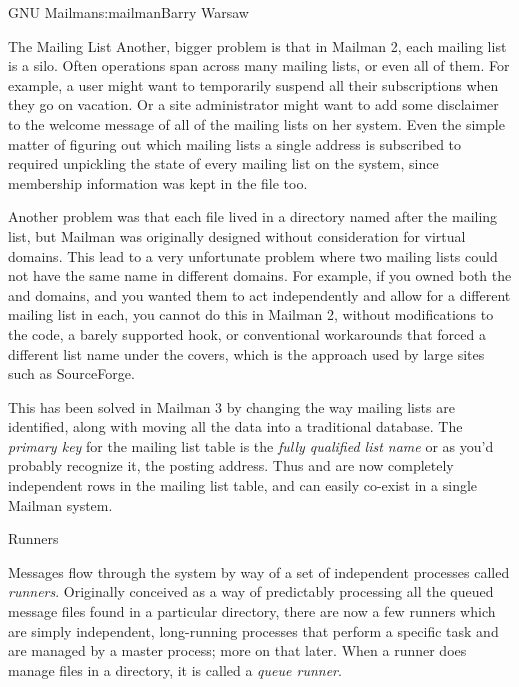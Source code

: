 \begin{aosachapter}{GNU Mailman}{s:mailman}{Barry Warsaw}
\begin{aosasect1}{The Mailing List}
Another, bigger problem is that in Mailman 2, each mailing list is a
silo.  Often operations span across many mailing lists, or even all of
them.  For example, a user might want to temporarily suspend all their
subscriptions when they go on vacation.  Or a site administrator might
want to add some disclaimer to the welcome message of all of the
mailing lists on her system.  Even the simple matter of figuring out
which mailing lists a single address is subscribed to required
unpickling the state of every mailing list on the system, since
membership information was kept in the  file too.

Another problem was that each  file lived in a
directory named after the mailing list, but Mailman was originally
designed without consideration for virtual domains.  This lead to a
very unfortunate problem where two mailing lists could not have the
same name in different domains.  For example, if you owned both the
 and  domains, and you wanted them
to act independently and allow for a different  mailing
list in each, you cannot do this in Mailman 2, without modifications
to the code, a barely supported hook, or conventional workarounds that
forced a different list name under the covers, which is the approach
used by large sites such as SourceForge.

This has been solved in Mailman 3 by changing the way mailing lists
are identified, along with moving all the data into a traditional
database.  The \emph{primary key} for the mailing list table is the
\emph{fully qualified list name} or as you'd probably recognize it,
the posting address.  Thus  and
 are now completely independent rows in the
mailing list table, and can easily co-exist in a single Mailman
system.

\end{aosasect1}

\begin{aosasect1}{Runners}

Messages flow through the system by way of a set of independent
processes called \emph{runners}.  Originally conceived as a way of
predictably processing all the queued message files found in a
particular directory, there are now a few runners which are simply
independent, long-running processes that perform a specific task and
are managed by a master process; more on that later.  When a runner
does manage files in a directory, it is called a \emph{queue runner}.


\end{aosasect1}
\end{aosachapter}
